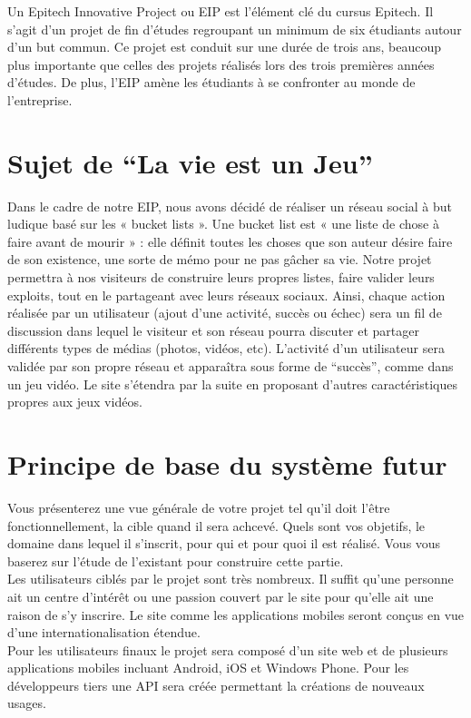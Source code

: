 \documentclass{life-fr}
\begin{document}
Un Epitech Innovative Project ou EIP est l'élément clé du cursus Epitech. Il s'agit d'un projet de fin d'études regroupant un minimum de six étudiants autour d'un but commun. Ce projet est conduit sur une durée de trois ans, beaucoup plus importante que celles des projets réalisés lors des trois premières années d'études. De plus, l'EIP amène les étudiants à se confronter au monde de l'entreprise.

\section{Sujet de ``La vie est un Jeu''}
Dans le cadre de notre EIP, nous avons décidé de réaliser un réseau social à but ludique basé sur les « bucket lists ». Une bucket list est « une liste de chose à faire avant de mourir » : elle définit toutes les choses que son auteur désire faire de son existence, une sorte de mémo pour ne pas gâcher sa vie. Notre projet permettra à nos visiteurs de construire leurs propres listes, faire valider leurs exploits, tout en le partageant avec leurs réseaux sociaux. Ainsi, chaque action réalisée par un utilisateur (ajout d'une activité, succès ou échec) sera un fil de discussion dans lequel le visiteur et son réseau pourra discuter et partager différents types de médias (photos, vidéos, etc). L'activité d'un utilisateur sera validée par son propre réseau et apparaîtra sous forme de “succès”, comme dans un jeu vidéo. Le site s'étendra par la suite en proposant d'autres caractéristiques propres aux jeux vidéos.

\section{Principe de base du système futur}

Vous présenterez une vue générale de votre projet tel qu’il doit l’être fonctionnellement, la cible quand il sera achcevé. Quels sont vos objetifs, le domaine dans lequel il s’inscrit, pour qui et pour quoi il est réalisé. Vous vous baserez sur l’étude de l’existant pour construire cette partie.\\

Les utilisateurs ciblés par le projet sont très nombreux. Il suffit qu'une personne ait un centre d'intérêt ou une passion couvert par le site pour qu'elle ait une raison de s'y inscrire. Le site comme les applications mobiles seront conçus en vue d'une internationalisation étendue.\\

Pour les utilisateurs finaux le projet sera composé d'un site web et de plusieurs applications mobiles incluant Android, iOS et Windows Phone. Pour les développeurs tiers une API sera créée permettant la créations de nouveaux usages.\\
\end{document}

